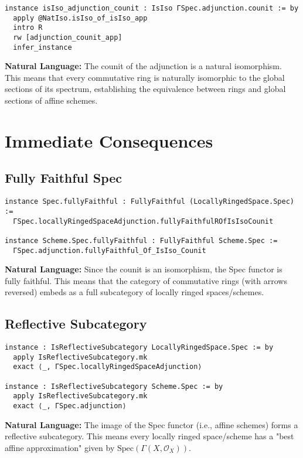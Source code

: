 \documentclass{article}
\theoremstyle{definition}
\begin{document}
{\begin{lstlisting}
instance isIso_adjunction_counit : IsIso ΓSpec.adjunction.counit := by
  apply @NatIso.isIso_of_isIso_app
  intro R
  rw [adjunction_counit_app]
  infer_instance
\end{lstlisting}

\textbf{Natural Language:} The counit of the adjunction is a natural isomorphism. This means that every commutative ring is naturally isomorphic to the global sections of its spectrum, establishing the equivalence between rings and global sections of affine schemes.

\section{Immediate Consequences}

\subsection{Fully Faithful Spec}

\begin{lstlisting}
instance Spec.fullyFaithful : FullyFaithful (LocallyRingedSpace.Spec) :=
  ΓSpec.locallyRingedSpaceAdjunction.fullyFaithfulROfIsIsoCounit

instance Scheme.Spec.fullyFaithful : FullyFaithful Scheme.Spec :=
  ΓSpec.adjunction.fullyFaithful_Of_IsIso_Counit
\end{lstlisting}

\textbf{Natural Language:} Since the counit is an isomorphism, the Spec functor is fully faithful. This means that the category of commutative rings (with arrows reversed) embeds as a full subcategory of locally ringed spaces/schemes.

\subsection{Reflective Subcategory}

\begin{lstlisting}
instance : IsReflectiveSubcategory LocallyRingedSpace.Spec := by
  apply IsReflectiveSubcategory.mk
  exact ⟨_, ΓSpec.locallyRingedSpaceAdjunction⟩
  
instance : IsReflectiveSubcategory Scheme.Spec := by
  apply IsReflectiveSubcategory.mk  
  exact ⟨_, ΓSpec.adjunction⟩
\end{lstlisting}

\textbf{Natural Language:} The image of the Spec functor (i.e., affine schemes) forms a reflective subcategory. This means every locally ringed space/scheme has a "best affine approximation" given by $\mathrm{Spec}(\Gamma(X, \mathcal{O}_X))$.

}
\end{document}
